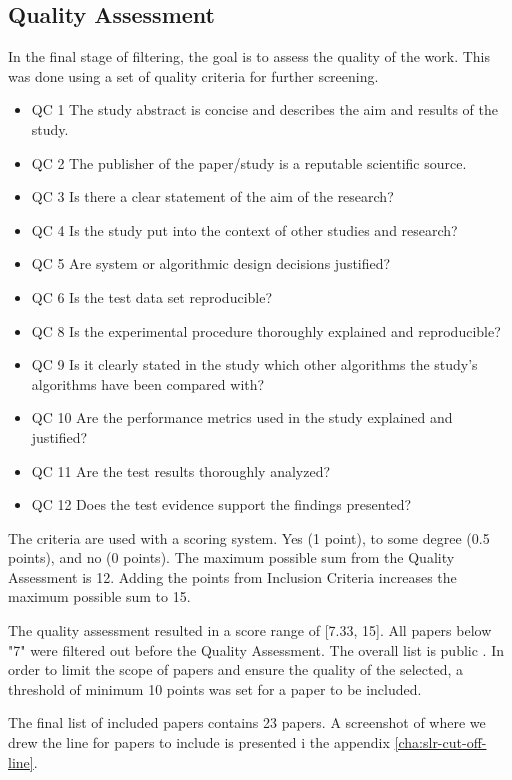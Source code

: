 \subsection{Quality Assessment}
In the final stage of filtering, the goal is to assess the quality of the work.
This was done using a set of quality criteria for further screening.
\begin{itemize}
  \item QC 1	The study abstract is concise and describes the aim and results of the study.
  \item QC 2	The publisher of the paper/study is a reputable scientific source.
  \item QC 3	Is there a clear statement of the aim of the research?
  \item QC 4	Is the study put into the context of other studies and research?
  \item QC 5	Are system or algorithmic design decisions justified?
  \item QC 6	Is the test data set reproducible?
  \item QC 8	Is the experimental procedure thoroughly explained and reproducible?
  \item QC 9	Is it clearly stated in the study which other algorithms the study's algorithms have been compared with?
  \item QC 10	Are the performance metrics used in the study explained and justified?
  \item QC 11	Are the test results thoroughly analyzed?
  \item QC 12 Does the test evidence support the findings presented?
\end{itemize}

The criteria are used with a scoring system.
Yes (1 point), to some degree (0.5 points), and no (0 points).
The maximum possible sum from the Quality Assessment is 12. Adding the points from Inclusion Criteria
increases the maximum possible sum to 15.

The quality assessment resulted in a score range of [7.33, 15].
All papers below "7" were filtered out before
the Quality Assessment.
The overall list is public
\cite{SLR-cutoff}.
In order to limit the scope of papers and ensure the quality of the selected, a threshold of minimum 10 points
was set for a paper to be included.

The final list of included papers contains 23 papers. A screenshot of where we drew the line for papers to include
is presented i the appendix \autoref{cha:slr-cut-off-line}.